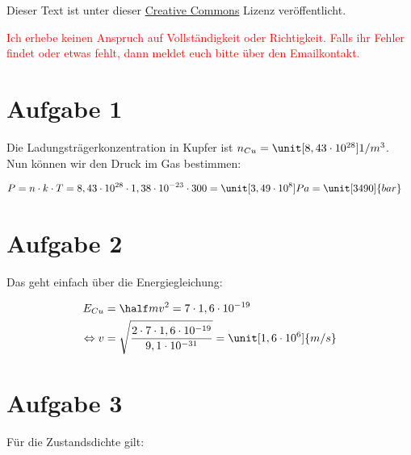 




\maketitle

Dieser Text ist unter dieser \href{http://creativecommons.org/licenses/by-nc-sa/4.0/}{Creative Commons} Lizenz veröffentlicht.

\textcolor{red}{Ich erhebe keinen Anspruch auf Vollständigkeit oder Richtigkeit. Falls ihr Fehler findet oder etwas fehlt, dann meldet euch bitte über den Emailkontakt.}

\tableofcontents


\newpage



\section{Aufgabe 1}


Die Ladungsträgerkonzentration in Kupfer ist $n_{Cu} = \unit[8,43 \cdot 10^{28}]{1/m^3}$. Nun können wir den Druck im Gas bestimmen:

\begin{align*}
P &=n \cdot k \cdot T = 8,43 \cdot 10^{28} \cdot 1,38 \cdot 10^{-23} \cdot 300 = \unit[3,49 \cdot 10^{8}]{Pa} = \unit[3490]{bar}
\end{align*}


\section{Aufgabe 2}

Das geht einfach über die Energiegleichung:

\begin{align*}
E_{Cu} &= \half mv^2 = 7 \cdot 1,6 \cdot 10^{-19} \\
\Leftrightarrow v &= \sqrt{\frac{2 \cdot 7 \cdot 1,6 \cdot 10^{-19}}{9,1 \cdot 10^{-31}}} = \unit[1,6 \cdot 10^6]{m/s} 
\end{align*}


\section{Aufgabe 3}

Für die Zustandsdichte gilt:

